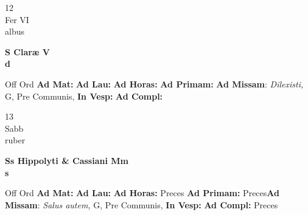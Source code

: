 \documentclass[10pt, openany]{book}
\begin{document}
    \begin{center}
        \begin{minipage}{3.5in}
            \vspace{2em}
            \begin{minipage}{0.5in}
                {\Huge 12} \\
                {\normalsize Fer VI} \\
                {\normalsize albus}
            \end{minipage}
            \begin{minipage}{3.0in}
                \textbf{ \large S Claræ V \\
                \textnormal{\normalsize d}} \\ 
            \end{minipage}
            \begin{justify}Off Ord
                \textbf{Ad Mat: }
                \textbf{Ad Lau: }
                \textbf{Ad Horas: }
                \textbf{Ad Primam: }\textbf{Ad Missam}: \textit{Dilexisti,} G, Pre Communis,  
                \textbf{In Vesp: }
                \textbf{Ad Compl: }
            \end{justify}
        \end{minipage}
    \end{center}

    \begin{center}
        \begin{minipage}{3.5in}
            \vspace{2em}
            \begin{minipage}{0.5in}
                {\Huge 13} \\
                {\normalsize Sabb} \\
                {\normalsize ruber}
            \end{minipage}
            \begin{minipage}{3.0in}
                \textbf{ \large Ss Hippolyti \& Cassiani Mm \\
                \textnormal{\normalsize s}} \\ 
            \end{minipage}
            \begin{justify}Off Ord
                \textbf{Ad Mat: }
                \textbf{Ad Lau: }
                \textbf{Ad Horas: }Preces
                \textbf{Ad Primam: }Preces\textbf{Ad Missam}: \textit{Salus autem,} G, Pre Communis,  
                \textbf{In Vesp: }
                \textbf{Ad Compl: }Preces
            \end{justify}
        \end{minipage}
    \end{center}
\end{document}
